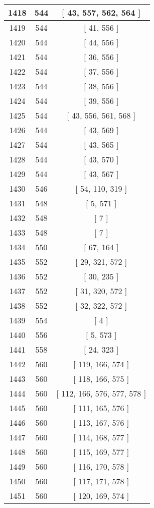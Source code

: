 \begin{center}
\begin{longtable}[H]{|| c c c ||}
\hline
1418 & 544 & [ 43, 557, 562, 564 ] \\ 
\hline
1419 & 544 & [ 41, 556 ] \\ 
\hline
1420 & 544 & [ 44, 556 ] \\ 
\hline
1421 & 544 & [ 36, 556 ] \\ 
\hline
1422 & 544 & [ 37, 556 ] \\ 
\hline
1423 & 544 & [ 38, 556 ] \\ 
\hline
1424 & 544 & [ 39, 556 ] \\ 
\hline
1425 & 544 & [ 43, 556, 561, 568 ] \\ 
\hline
1426 & 544 & [ 43, 569 ] \\ 
\hline
1427 & 544 & [ 43, 565 ] \\ 
\hline
1428 & 544 & [ 43, 570 ] \\ 
\hline
1429 & 544 & [ 43, 567 ] \\ 
\hline
1430 & 546 & [ 54, 110, 319 ] \\ 
\hline
1431 & 548 & [ 5, 571 ] \\ 
\hline
1432 & 548 & [ 7 ] \\ 
\hline
1433 & 548 & [ 7 ] \\ 
\hline
1434 & 550 & [ 67, 164 ] \\ 
\hline
1435 & 552 & [ 29, 321, 572 ] \\ 
\hline
1436 & 552 & [ 30, 235 ] \\ 
\hline
1437 & 552 & [ 31, 320, 572 ] \\ 
\hline
1438 & 552 & [ 32, 322, 572 ] \\ 
\hline
1439 & 554 & [ 4 ] \\ 
\hline
1440 & 556 & [ 5, 573 ] \\ 
\hline
1441 & 558 & [ 24, 323 ] \\ 
\hline
1442 & 560 & [ 119, 166, 574 ] \\ 
\hline
1443 & 560 & [ 118, 166, 575 ] \\ 
\hline
1444 & 560 & [ 112, 166, 576, 577, 578 ] \\ 
\hline
1445 & 560 & [ 111, 165, 576 ] \\ 
\hline
1446 & 560 & [ 113, 167, 576 ] \\ 
\hline
1447 & 560 & [ 114, 168, 577 ] \\ 
\hline
1448 & 560 & [ 115, 169, 577 ] \\ 
\hline
1449 & 560 & [ 116, 170, 578 ] \\ 
\hline
1450 & 560 & [ 117, 171, 578 ] \\ 
\hline
1451 & 560 & [ 120, 169, 574 ] \\ 

\end{longtable}
\end{center}
